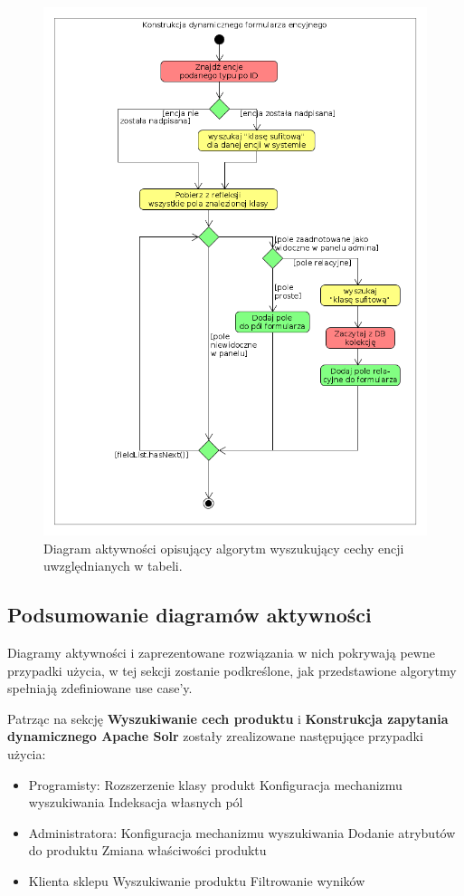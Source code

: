 \begin{figure}
	\begin{center}
		\includegraphics[scale=0.5]{konsFormEnc.png}
	\end{center}
	\caption{{\color{black}Diagram aktywności opisujący algorytm wyszukujący cechy encji uwzględnianych w tabeli.}} \label{konsFormEnc}
\end{figure}

\subsection{Podsumowanie diagramów aktywności}
Diagramy aktywności i zaprezentowane rozwiązania w nich pokrywają pewne przypadki użycia, w tej sekcji zostanie podkreślone, jak przedstawione algorytmy spełniają zdefiniowane use case'y.

Patrząc na sekcję \textbf{Wyszukiwanie cech produktu} i \textbf{Konstrukcja zapytania dynamicznego Apache Solr} zostały zrealizowane następujące przypadki użycia:
\begin{itemize}
	\item Programisty: 
	\subitem Rozszerzenie klasy produkt
	\subitem Konfiguracja mechanizmu wyszukiwania
	\subitem Indeksacja własnych pól
	\item Administratora:
	\subitem Konfiguracja mechanizmu wyszukiwania
	\subitem Dodanie atrybutów do produktu
	\subitem Zmiana właściwości produktu
	\item Klienta sklepu
	\subitem Wyszukiwanie produktu
	\subitem Filtrowanie wyników
\end{itemize}

